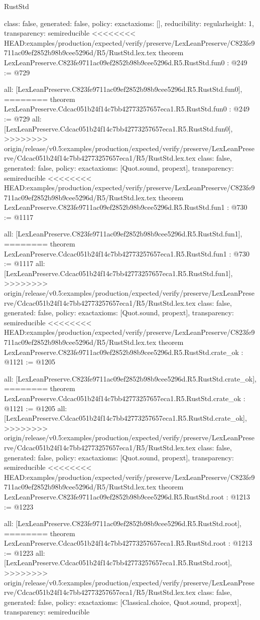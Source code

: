 \begin{lexlean}{RustStd}
\begin{coremodule}
{\begin{coremodule}
{{{  class: false,
  generated: false,
  policy: exact{axioms: []},
  reducibility: regular{height: 1},
  transparency: semireducible
}
<<<<<<<< HEAD:examples/production/expected/verify/preserve/LexLeanPreserve/C823fe9711ac09ef2852b98b9cee5296d/R5/RustStd.lex.tex
theorem LexLeanPreserve.C823fe9711ac09ef2852b98b9cee5296d.R5.RustStd.fun0 : @249 := @729 {
  all: [LexLeanPreserve.C823fe9711ac09ef2852b98b9cee5296d.R5.RustStd.fun0],
========
theorem LexLeanPreserve.Cdcac051b24f14c7bb42773257657eca1.R5.RustStd.fun0 : @249 := @729 {
  all: [LexLeanPreserve.Cdcac051b24f14c7bb42773257657eca1.R5.RustStd.fun0],
>>>>>>>> origin/release/v0.5:examples/production/expected/verify/preserve/LexLeanPreserve/Cdcac051b24f14c7bb42773257657eca1/R5/RustStd.lex.tex
  class: false,
  generated: false,
  policy: exact{axioms: [Quot.sound, propext]},
  transparency: semireducible
}
<<<<<<<< HEAD:examples/production/expected/verify/preserve/LexLeanPreserve/C823fe9711ac09ef2852b98b9cee5296d/R5/RustStd.lex.tex
theorem LexLeanPreserve.C823fe9711ac09ef2852b98b9cee5296d.R5.RustStd.fun1 : @730 := @1117 {
  all: [LexLeanPreserve.C823fe9711ac09ef2852b98b9cee5296d.R5.RustStd.fun1],
========
theorem LexLeanPreserve.Cdcac051b24f14c7bb42773257657eca1.R5.RustStd.fun1 : @730 := @1117 {
  all: [LexLeanPreserve.Cdcac051b24f14c7bb42773257657eca1.R5.RustStd.fun1],
>>>>>>>> origin/release/v0.5:examples/production/expected/verify/preserve/LexLeanPreserve/Cdcac051b24f14c7bb42773257657eca1/R5/RustStd.lex.tex
  class: false,
  generated: false,
  policy: exact{axioms: [Quot.sound, propext]},
  transparency: semireducible
}
<<<<<<<< HEAD:examples/production/expected/verify/preserve/LexLeanPreserve/C823fe9711ac09ef2852b98b9cee5296d/R5/RustStd.lex.tex
theorem LexLeanPreserve.C823fe9711ac09ef2852b98b9cee5296d.R5.RustStd.crate_ok : @1121 := @1205 {
  all: [LexLeanPreserve.C823fe9711ac09ef2852b98b9cee5296d.R5.RustStd.crate_ok],
========
theorem LexLeanPreserve.Cdcac051b24f14c7bb42773257657eca1.R5.RustStd.crate_ok : @1121 := @1205 {
  all: [LexLeanPreserve.Cdcac051b24f14c7bb42773257657eca1.R5.RustStd.crate_ok],
>>>>>>>> origin/release/v0.5:examples/production/expected/verify/preserve/LexLeanPreserve/Cdcac051b24f14c7bb42773257657eca1/R5/RustStd.lex.tex
  class: false,
  generated: false,
  policy: exact{axioms: [Quot.sound, propext]},
  transparency: semireducible
}
<<<<<<<< HEAD:examples/production/expected/verify/preserve/LexLeanPreserve/C823fe9711ac09ef2852b98b9cee5296d/R5/RustStd.lex.tex
theorem LexLeanPreserve.C823fe9711ac09ef2852b98b9cee5296d.R5.RustStd.root : @1213 := @1223 {
  all: [LexLeanPreserve.C823fe9711ac09ef2852b98b9cee5296d.R5.RustStd.root],
========
theorem LexLeanPreserve.Cdcac051b24f14c7bb42773257657eca1.R5.RustStd.root : @1213 := @1223 {
  all: [LexLeanPreserve.Cdcac051b24f14c7bb42773257657eca1.R5.RustStd.root],
>>>>>>>> origin/release/v0.5:examples/production/expected/verify/preserve/LexLeanPreserve/Cdcac051b24f14c7bb42773257657eca1/R5/RustStd.lex.tex
  class: false,
  generated: false,
  policy: exact{axioms: [Classical.choice, Quot.sound, propext]},
  transparency: semireducible
}

}}}}}}
\end{coremodule}}
\end{coremodule}
\end{lexlean}
